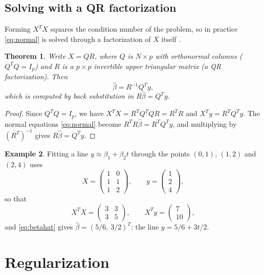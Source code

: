 \documentclass[11pt,oneside,openany]{book}
\newtheorem{theorem}{Theorem}[chapter]
\theoremstyle{definition}
\newtheorem{example}[theorem]{Example}
\numberwithin{equation}{chapter}
\begin{document}
\section{Solving with a QR factorization}
Forming $X^TX$ squares the condition number of the problem, so in practice \eqref{eq:normal} is
solved through a factorization of $X$ itself \citep{golub2013, trefethen1997}.
\begin{theorem}\label{thm:qr}
Write $X = QR$, where $Q$ is $N \times p$ with orthonormal columns ($Q^T Q = I_p$) and $R$ is a $p \times p$
invertible upper triangular matrix (a \emph{QR factorization}). Then
\begin{equation}\label{eq:qr}
\hat\beta = R^{-1} Q^T y ,
\end{equation}
which is computed by back substitution in $R \hat\beta = Q^T y$.
\end{theorem}
\begin{proof}
Since $Q^T Q = I_p$, we have $X^T X = R^T Q^T Q R = R^T R$ and $X^T y = R^T Q^T y$. The normal equations
\eqref{eq:normal} become $R^T R \hat\beta = R^T Q^T y$, and multiplying by $(R^T)^{-1}$ gives $R \hat\beta = Q^T y$.
\end{proof}
\begin{example}\label{ex:line}
Fitting a line $y \approx \beta_1 + \beta_2 t$ through the points $(0, 1)$, $(1, 2)$ and $(2, 4)$ uses
\[
X = \begin{pmatrix} 1 & 0 \\ 1 & 1 \\ 1 & 2 \end{pmatrix}, \qquad y = \begin{pmatrix} 1 \\ 2 \\ 4 \end{pmatrix},
\]
so that
\[
X^T X = \begin{pmatrix} 3 & 3 \\ 3 & 5 \end{pmatrix}, \qquad X^T y = \begin{pmatrix} 7 \\ 10 \end{pmatrix},
\]
and \eqref{eq:betahat} gives $\hat\beta = (5/6,\ 3/2)^T$: the line $y = 5/6 + 3t/2$.
\end{example}

\chapter{Regularization}\label{ch:reg}
\end{document}
